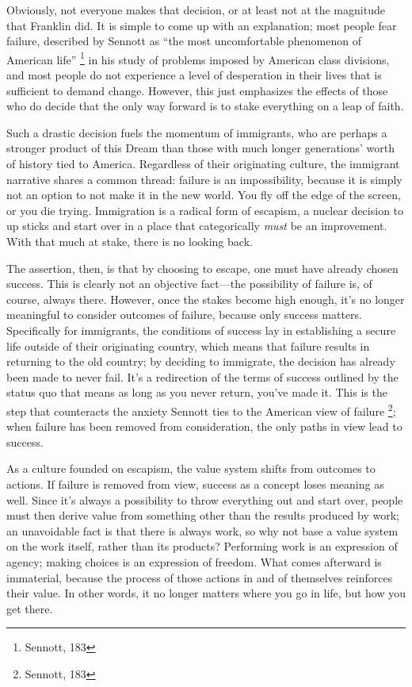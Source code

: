 Obviously, not everyone makes that decision, or at least not at the magnitude
that Franklin did. It is simple to come up with an explanation; most people
fear failure, described by Sennott as ``the most uncomfortable phenomenon of
American life'' \footnote{Sennott, 183} in his study of problems imposed by
American class divisions, and most people do not experience
a level of desperation in their lives that is sufficient to demand change.
However, this just emphasizes the effects of those who do decide that the only
way forward is to stake everything on a leap of faith.

Such a drastic decision fuels the momentum of immigrants, who are perhaps a
stronger product of this Dream than those with much longer generations' worth
of history tied to America. Regardless of their originating culture, the
immigrant narrative shares a common thread: failure is an impossibility,
because it is simply not an option to not make it in the new world. You fly off
the edge of the screen, or you die trying. Immigration
is a radical form of escapism, a nuclear decision to up sticks and start over
in a place that categorically \textit{must} be an improvement. With that much at
stake, there is no looking back.

The assertion, then, is that by choosing to escape, one must have already
chosen success. This is clearly not an objective fact---the possibility of
failure is, of course, always there. However, once the stakes become high
enough, it's no longer meaningful to consider outcomes of failure, because
only success matters. Specifically for immigrants, the conditions of success
lay in establishing a secure life outside of their originating country, which
means that failure results in returning to the old country; by deciding to immigrate,
the decision has already been made to never fail. It's a
redirection of the terms of success outlined by the status quo that means as
long as you never return, you've made it. This is the step that counteracts
the anxiety Sennott ties to the American view of failure \footnote{Sennott, 183}; when
failure has been removed from consideration, the only paths in view lead to
success.

As a culture founded on escapism, the value system shifts from outcomes to
actions. If failure is removed from view, success as a concept loses meaning
as well.  Since it's always a possibility to throw everything out and start
over, people must then derive value from something other than the results
produced by work; an unavoidable fact is that there is always work, so why not
base a value system on the work itself, rather than its products? Performing
work is an expression of agency; making choices is an expression of freedom.
What comes afterward is immaterial, because the process of those actions in
and of themselves reinforces their value. In other words, it no longer matters
where you go in life, but how you get there.

